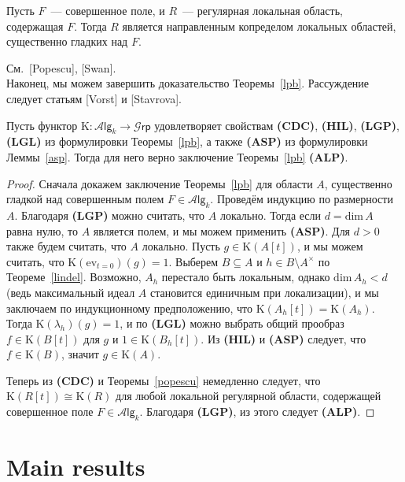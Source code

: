 \documentclass[oneside, 11pt]{amsart} \pdfoutput=1
\begin{document}
\begin{theorem}[Popescu]
\label{popescu}
Пусть $F$~--- совершенное поле, и $R$~--- регулярная локальная область, содержащая $F$. Тогда $R$ является направленным копределом локальных областей, существенно гладких над $F$.
\end{theorem}
См.~[Popescu], [Swan].\\

Наконец, мы можем завершить доказательство Теоремы~\ref{lpb}. Рассуждение следует статьям [Vorst] и [Stavrova].

\begin{lemma}
Пусть функтор $\mathrm K\colon\mathcal A\mathsf{lg}_k\rightarrow\mathcal G\mathsf{rp}$ удовлетворяет свойствам {\bf(CDC)}, {\bf(HIL)}, {\bf(LGP)}, {\bf(LGL)} из формулировки Теоремы~\ref{lpb}, а также {\bf(ASP)} из формулировки Леммы~\ref{asp}. Тогда для него верно заключение Теоремы~\ref{lpb} {\bf(ALP)}. 
\end{lemma}
\begin{proof}
Сначала докажем заключение Теоремы~\ref{lpb} для области $A$, существенно гладкой над совершенным полем $F\in\mathcal A\mathsf{lg}_k$. Проведём индукцию по размерности $A$. Благодаря {\bf(LGP)} можно считать, что $A$ локально. Тогда если $d=\mathrm{dim}\,A$ равна нулю, то $A$ является полем, и мы можем применить {\bf(ASP)}. Для $d>0$ также будем считать, что $A$ локально. Пусть $g\in\mathrm K(A[t])$, и мы можем считать, что $\mathrm K(\mathrm{ev}_{t=0})(g)=1$. Выберем $B\subseteq A$ и $h\in B\setminus A^\times$ по Теореме~\ref{lindel}. Возможно, $A_h$ перестало быть локальным, однако $\mathrm{dim}\,A_h<d$ (ведь максимальный идеал $A$ становится единичным при локализации), и мы заключаем по индукционному предположению, что $\mathrm K(A_h[t])=\mathrm K(A_h)$. Тогда $\mathrm K(\lambda_h)(g)=1$, и по {\bf(LGL)} можно выбрать общий прообраз $f\in\mathrm K(B[t])$ для $g$ и $1\in\mathrm K(B_h[t])$. Из {\bf(HIL)} и {\bf(ASP)} следует, что $f\in\mathrm K(B)$, значит $g\in\mathrm K(A)$.

Теперь из {\bf(CDC)} и Теоремы~\ref{popescu} немедленно следует, что $\mathrm K(R[t])\cong\mathrm K(R)$ для любой локальной регулярной области, содержащей совершенное поле $F\in\mathcal A\mathsf{lg}_k$. Благодаря {\bf(LGP)}, из этого следует {\bf(ALP)}.
\end{proof}

\section{Main results}
\end{document}
